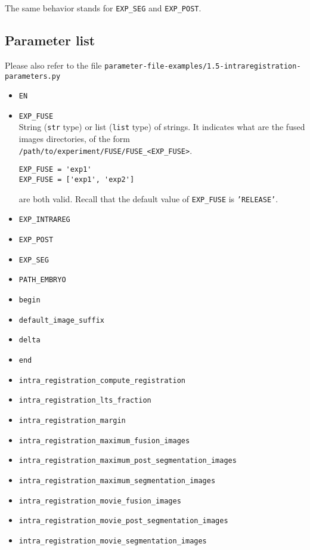The same behavior stands for \texttt{EXP\_SEG} and  \texttt{EXP\_POST}.



\subsection{Parameter list}

Please also refer to the file
\texttt{parameter-file-examples/1.5-intraregistration-parameters.py}

\begin{itemize}
\itemsep -0.5ex
\item \texttt{EN}
\item \texttt{EXP\_FUSE} \\
  String (\texttt{str} type) or list (\texttt{list} type) of
  strings. It indicates what are the fused images directories, of the form
  \texttt{/path/to/experiment/FUSE/FUSE\_<EXP\_FUSE>}.
\begin{verbatim}
EXP_FUSE = 'exp1'
EXP_FUSE = ['exp1', 'exp2']
\end{verbatim}
  are both valid. Recall that the default value of \texttt{EXP\_FUSE}
  is \texttt{'RELEASE'}.
\item \texttt{EXP\_INTRAREG}
\item \texttt{EXP\_POST}
\item \texttt{EXP\_SEG}
\item \texttt{PATH\_EMBRYO}
\item \texttt{begin}
\item \texttt{default\_image\_suffix}
\item \texttt{delta}
\item \texttt{end}
\item \texttt{intra\_registration\_compute\_registration}
\item \texttt{intra\_registration\_lts\_fraction}
\item \texttt{intra\_registration\_margin}
\item \texttt{intra\_registration\_maximum\_fusion\_images}
\item \texttt{intra\_registration\_maximum\_post\_segmentation\_images}
\item \texttt{intra\_registration\_maximum\_segmentation\_images}
\item \texttt{intra\_registration\_movie\_fusion\_images}
\item \texttt{intra\_registration\_movie\_post\_segmentation\_images}
\item \texttt{intra\_registration\_movie\_segmentation\_images}

\end{itemize}
